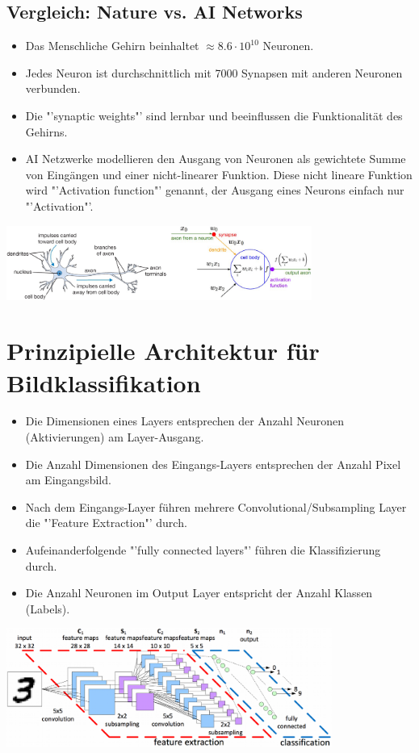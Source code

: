 \subsection{Vergleich: Nature vs. AI Networks}
\begin{itemize}[noitemsep,topsep=3pt]
	\item Das Menschliche Gehirn beinhaltet $\approx 8.6 \cdot 10^{10}$ Neuronen.
	\item Jedes Neuron ist durchschnittlich mit 7000 Synapsen mit anderen Neuronen verbunden.
	\item Die "'synaptic weights"' sind lernbar und beeinflussen die Funktionalität des Gehirns.
	\item AI Netzwerke modellieren den Ausgang von Neuronen als gewichtete Summe von Eingängen 
				und einer nicht-linearer Funktion. Diese nicht lineare Funktion wird "'Activation function"' 
				genannt, der Ausgang eines Neurons einfach nur "'Activation"'.
\end{itemize}
\begin{center}
		\includegraphics[width=0.75\textwidth]{../fig/neuron_aufbau}
\end{center}

\section{Prinzipielle Architektur für Bildklassifikation}
\begin{itemize}[noitemsep,topsep=3pt]
	\item Die Dimensionen eines Layers entsprechen der Anzahl Neuronen (Aktivierungen) am Layer-Ausgang.
	\item Die Anzahl Dimensionen des Eingangs-Layers entsprechen der Anzahl Pixel am Eingangsbild.
	\item Nach dem Eingangs-Layer führen mehrere Convolutional/Subsampling Layer die "'Feature Extraction"' durch.
	\item Aufeinanderfolgende "'fully connected layers"' führen die Klassifizierung durch.
	\item Die Anzahl Neuronen im Output Layer entspricht der Anzahl Klassen (Labels).
\end{itemize}
\begin{center}
		\includegraphics[width=0.8\textwidth]{../fig/cnn_architecture_image_recognition}
\end{center}

